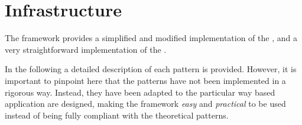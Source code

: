 \section{\label{MVCO} \mvco Infrastructure}


The \mvco framework provides a simplified and modified implementation
of the \mvc, and a very straightforward implementation of the \obs.

In the following a detailed description of each pattern is provided.
However, it is important to pinpoint here that the patterns have not
been implemented in a rigorous way. Instead, they have been adapted to
the particular way \pygtk based application are designed, making the
framework \emph{easy} and \emph{practical} to be used instead of being
fully compliant with the theoretical patterns.



